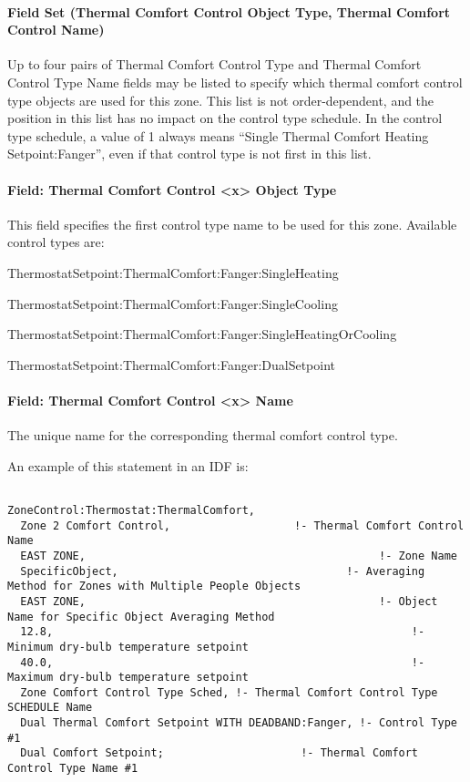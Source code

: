 \paragraph{Field Set (Thermal Comfort Control Object Type, Thermal Comfort Control Name)}\label{field-set-thermal-comfort-control-object-type-thermal-comfort-control-name}

Up to four pairs of Thermal Comfort Control Type and Thermal Comfort Control Type Name fields may be listed to specify which thermal comfort control type objects are used for this zone. This list is not order-dependent, and the position in this list has no impact on the control type schedule. In the control type schedule, a value of 1 always means ``Single Thermal Comfort Heating Setpoint:Fanger'', even if that control type is not first in this list.

\paragraph{Field: Thermal Comfort Control \textless{}x\textgreater{} Object Type}\label{field-thermal-comfort-control-x-object-type}

This field specifies the first control type name to be used for this zone. Available control types are:

ThermostatSetpoint:ThermalComfort:Fanger:SingleHeating

ThermostatSetpoint:ThermalComfort:Fanger:SingleCooling

ThermostatSetpoint:ThermalComfort:Fanger:SingleHeatingOrCooling

ThermostatSetpoint:ThermalComfort:Fanger:DualSetpoint

\paragraph{Field: Thermal Comfort Control \textless{}x\textgreater{} Name}\label{field-thermal-comfort-control-x-name}

The unique name for the corresponding thermal comfort control type.

An example of this statement in an IDF is:

\begin{lstlisting}

ZoneControl:Thermostat:ThermalComfort,
  Zone 2 Comfort Control,                   !- Thermal Comfort Control Name
  EAST ZONE,                                             !- Zone Name
  SpecificObject,                                   !- Averaging Method for Zones with Multiple People Objects
  EAST ZONE,                                             !- Object Name for Specific Object Averaging Method
  12.8,                                                       !- Minimum dry-bulb temperature setpoint
  40.0,                                                       !- Maximum dry-bulb temperature setpoint
  Zone Comfort Control Type Sched, !- Thermal Comfort Control Type SCHEDULE Name
  Dual Thermal Comfort Setpoint WITH DEADBAND:Fanger, !- Control Type #1
  Dual Comfort Setpoint;                     !- Thermal Comfort Control Type Name #1
\end{lstlisting}

